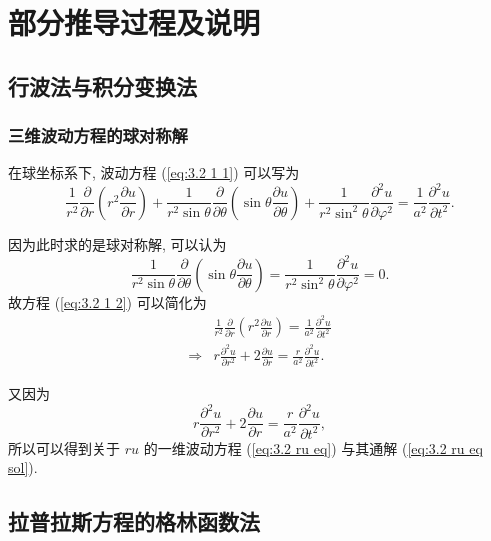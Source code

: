 \section{部分推导过程及说明} \label{部分推导过程及说明}
\subsection{行波法与积分变换法} \label{proofs 行波法与积分变换法}
\subsubsection{三维波动方程的球对称解} \label{proofs 3 三维波动方程的球对称解}
在球坐标系下, 波动方程 (\ref{eq:3.2 1 1}) 可以写为
\begin{equation}
    \frac{1}{r^2}\frac{\partial}{\partial r}\left(r^2\frac{\partial u}{\partial r}\right)+\frac{1}{r^2\sin\theta}\frac{\partial}{\partial\theta}\left(\sin\theta\frac{\partial u}{\partial\theta}\right)+\frac{1}{r^2\sin^2\theta}\frac{\partial^2u}{\partial\varphi^2}=\frac{1}{a^2}\frac{\partial^2u}{\partial t^2}.
\end{equation}

因为此时求的是球对称解, 可以认为
\begin{equation} \label{eq:3.2 1 2}
    \frac{1}{r^2\sin\theta}\frac{\partial}{\partial\theta}\left(\sin\theta\frac{\partial u}{\partial\theta}\right)=\frac{1}{r^2\sin^2\theta}\frac{\partial^2u}{\partial\varphi^2}=0.
\end{equation}
故方程 (\ref{eq:3.2 1 2}) 可以简化为
\begin{equation}
    \begin{aligned}
                    & \frac{1}{r^2}\frac{\partial}{\partial r}\left(r^2\frac{\partial u}{\partial r}\right)=\frac{1}{a^2}\frac{\partial^2u}{\partial t^2} \\
        \Rightarrow & r\frac{\partial^2u}{\partial r^2}+2\frac{\partial u}{\partial r}=\frac{r}{a^2}\frac{\partial^2u}{\partial t^2}.
    \end{aligned}
\end{equation}

又因为
\begin{equation*}
    r\frac{\partial^2u}{\partial r^2}+2\frac{\partial u}{\partial r}=\frac{r}{a^2}\frac{\partial^2u}{\partial t^2},
\end{equation*}
所以可以得到关于 $ru$ 的一维波动方程 (\ref{eq:3.2 ru eq}) 与其通解 (\ref{eq:3.2 ru eq sol}).

\subsection{拉普拉斯方程的格林函数法} \label{proofs 拉普拉斯方程的格林函数法}
